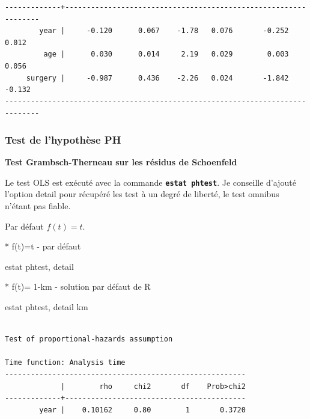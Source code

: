 \documentclass[
  12pt,
  letterpaper,
  DIV=11,
  numbers=noendperiod,
  onepage,
  openany]{scrreprt}
\newenvironment{Shaded}{\begin{snugshade}}{\end{snugshade}}
\newcommand{\KeywordTok}[1]{\textcolor[rgb]{0.94,0.87,0.69}{#1}}
\newcommand{\NormalTok}[1]{\textcolor[rgb]{0.80,0.80,0.80}{#1}}
\begin{document}
\begin{verbatim}
-------------+----------------------------------------------------------------
        year |     -0.120      0.067    -1.78   0.076       -0.252       0.012
         age |      0.030      0.014     2.19   0.029        0.003       0.056
     surgery |     -0.987      0.436    -2.26   0.024       -1.842      -0.132
------------------------------------------------------------------------------
\end{verbatim}

\hypertarget{test-de-lhypothuxe8se-ph}{%
\subsubsection{Test de l'hypothèse PH}\label{test-de-lhypothuxe8se-ph}}

\textbf{Test Grambsch-Therneau sur les résidus de Schoenfeld}

Le test OLS est exécuté avec la commande
\textbf{\texttt{estat\ phtest}}. Je conseille d'ajouté l'option detail
pour récupéré les test à un degré de liberté, le test omnibus n'étant
pas fiable.

Par défaut \(f(t)=t\).

\begin{Shaded}
\begin{Highlighting}[]
\NormalTok{* f(t)=t {-} par défaut }

\KeywordTok{estat}\NormalTok{ phtest, }\KeywordTok{detail}


\NormalTok{* f(t)= 1{-}km {-} solution par défaut }\KeywordTok{de}\NormalTok{ R}
      
\KeywordTok{estat}\NormalTok{ phtest, }\KeywordTok{detail}\NormalTok{ km}
\end{Highlighting}
\end{Shaded}

\begin{verbatim}

Test of proportional-hazards assumption

Time function: Analysis time
--------------------------------------------------------
             |        rho     chi2       df    Prob>chi2
-------------+------------------------------------------
        year |    0.10162     0.80        1       0.3720
\end{verbatim}
\end{document}
